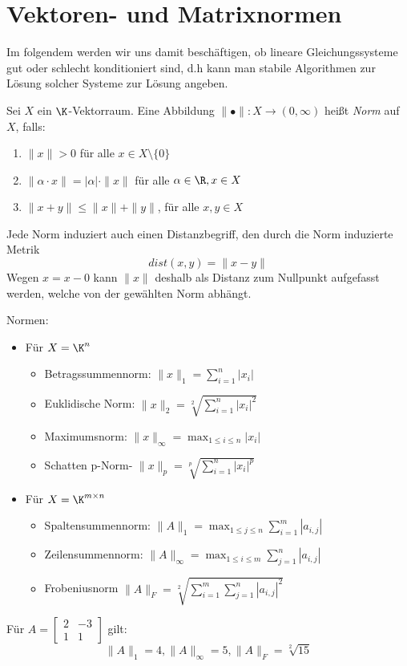 \section{Vektoren- und Matrixnormen}

Im folgendem werden wir uns damit beschäftigen, ob lineare Gleichungssysteme gut oder schlecht konditioniert sind, d.h kann man stabile Algorithmen zur Lösung solcher Systeme zur Lösung angeben.

\begin{definition}
Sei $X$ ein $\K$-Vektorraum. Eine Abbildung $\|•\| \colon X \to (0,\infty) $ heißt \emph{Norm} auf $X$, falls:
\begin{enumerate}
	\item $\|x\|>0$ für alle $x \in X \setminus \{0\}$
	\item $\| \alpha \cdot x \|= |\alpha| \cdot \|x\|$ für alle $\alpha \in \R, x \in X$
	\item $\|x+y\|\le \|x\|+\|y\|$, für alle $x,y \in X$ 
\end{enumerate}
\end{definition}
\begin{remark}
Jede Norm induziert auch einen Distanzbegriff, den durch die Norm induzierte Metrik 
\[
dist(x,y)=\|x-y\|
\]
Wegen $x=x-0$ kann $\|x\|$ deshalb als Distanz zum Nullpunkt aufgefasst werden, welche von der gewählten Norm abhängt.  
\end{remark}
\begin{example}Normen:
\begin{itemize}
	\item Für $X= \K^{n}$
		\begin{itemize}
			\item Betragssummennorm: $\|x\|_1 = \sum_{i=1}^{n}|x_{i}|$
			\item Euklidische Norm: $\|x\|_2 = \sqrt[2]{\sum_{i=1}^{n}|x_{i}|^2} $ 
			\item Maximumsnorm: $\|x\|_{\infty} = \max_{1\le i\le n} |x_{i}|$ 
			\item Schatten p-Norm- $\|x\|_p = \sqrt[p]{\sum_{i=1}^{n}|x_{i}|^{p}} $ 
		\end{itemize}
	\item Für $X = \K^{m\times n}$ 
		\begin{itemize}
			\item Spaltensummennorm: $\|A\|_1 = \max_{1\le j\le n} \sum_{i=1}^{m}|a_{i,j}|$ 
		\item Zeilensummennorm: $\|A\|_{\infty} = \max_{1\le i\le m} \sum_{j=1}^{n}|a_{i,j}|$
		\item Frobeniusnorm $\|A\|_F = \sqrt[2]{\sum_{i=1}^{m}\sum_{j=1}^{n}|a_{i,j}|^2}$ 
		\end{itemize}
\end{itemize}
Für $A = \begin{bmatrix}
	2  & -3 \\
	1 & 1 
\end{bmatrix}$
gilt: 
\[
\|A\|_1=4 , \|A\|_{\infty} = 5, \|A\|_F = \sqrt[2]{15} 
\]
\end{example}

